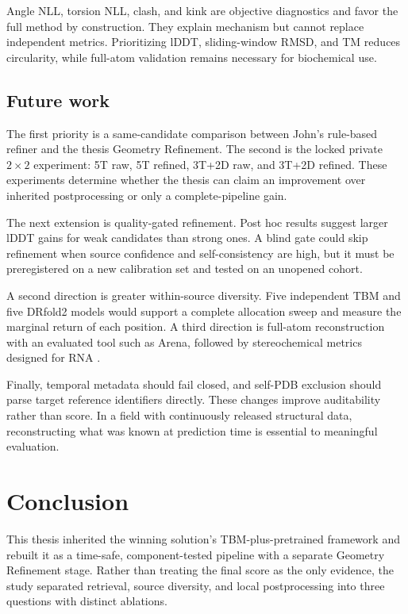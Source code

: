 \documentclass[12pt,a4paper,oneside]{report}
\begin{document}
Angle NLL, torsion NLL, clash, and kink are objective diagnostics and favor the full
method by construction. They explain mechanism but cannot replace independent metrics.
Prioritizing lDDT, sliding-window RMSD, and TM reduces circularity, while full-atom
validation remains necessary for biochemical use.

\section{Future work}

The first priority is a same-candidate comparison between John's rule-based refiner and
the thesis Geometry Refinement. The second is the locked private $2\times2$ experiment:
5T raw, 5T refined, 3T+2D raw, and 3T+2D refined. These experiments determine whether
the thesis can claim an improvement over inherited postprocessing or only a
complete-pipeline gain.

The next extension is quality-gated refinement. Post hoc results suggest larger lDDT
gains for weak candidates than strong ones. A blind gate could skip refinement when
source confidence and self-consistency are high, but it must be preregistered on a new
calibration set and tested on an unopened cohort.

A second direction is greater within-source diversity. Five independent TBM and five
DRfold2 models would support a complete allocation sweep and measure the marginal return
of each position. A third direction is full-atom reconstruction with an evaluated tool
such as Arena, followed by stereochemical metrics designed for RNA
\cite{arena,rna_puzzles_toolkit}.

Finally, temporal metadata should fail closed, and self-PDB exclusion should parse target
reference identifiers directly. These changes improve auditability rather than score. In
a field with continuously released structural data, reconstructing what was known at
prediction time is essential to meaningful evaluation.

\chapter{Conclusion}
\label{chap:conclusion_en}

This thesis inherited the winning solution's TBM-plus-pretrained framework and rebuilt it
as a time-safe, component-tested pipeline with a separate Geometry Refinement stage.
Rather than treating the final score as the only evidence, the study separated retrieval,
source diversity, and local postprocessing into three questions with distinct ablations.
\end{document}
